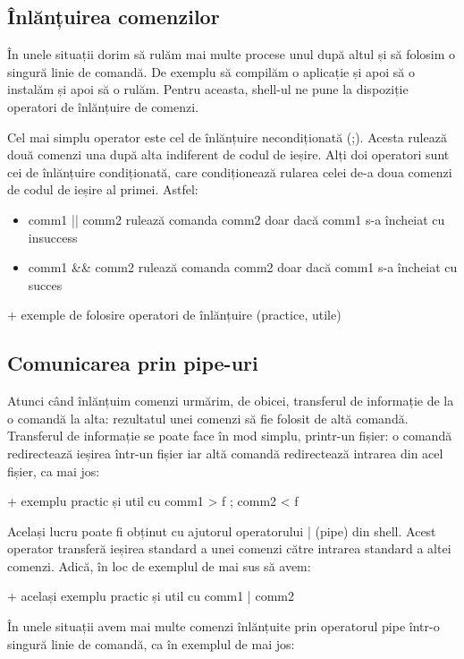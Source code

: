 \subsection{Înlănțuirea comenzilor}
\label{sec:procese-operatii-inlantuire}

În unele situații dorim să rulăm mai multe procese unul după altul și să folosim
o singură linie de comandă. De exemplu să compilăm o aplicație și apoi să o
instalăm și apoi să o rulăm. Pentru aceasta, shell-ul ne pune la dispoziție
operatori de înlănțuire de comenzi.

Cel mai simplu operator este cel de înlănțuire necondiționată (;). Acesta
rulează două comenzi una după alta indiferent de codul de ieșire. Alți doi
operatori sunt cei de înlănțuire condiționată, care condiționează rularea celei
de-a doua comenzi de codul de ieșire al primei. Astfel:

\begin{itemize}
	\item comm1 || comm2 rulează comanda comm2 doar dacă comm1 s-a încheiat cu insuccess
	\item comm1 \&\& comm2 rulează comanda comm2 doar dacă comm1 s-a încheiat cu succes
\end{itemize}

+ exemple de folosire operatori de înlănțuire (practice, utile)

\subsection{Comunicarea prin pipe-uri}
\label{sec:procese-operatii-pipe}

Atunci când înlănțuim comenzi urmărim, de obicei, transferul de informație de la
o comandă la alta: rezultatul unei comenzi să fie folosit de altă comandă.
Transferul de informație se poate face în mod simplu, printr-un fișier: o
comandă redirectează ieșirea într-un fișier iar altă comandă redirectează
intrarea din acel fișier, ca mai jos:

+     exemplu practic și util cu comm1 > f ; comm2 < f

Același lucru poate fi obținut cu ajutorul operatorului | (pipe) din shell.
Acest operator transferă ieșirea standard a unei comenzi către intrarea standard
a altei comenzi. Adică, în loc de exemplul de mai sus să avem:

+     același exemplu practic și util cu comm1 | comm2

În unele situații avem mai multe comenzi înlănțuite prin operatorul pipe într-o
singură linie de comandă, ca în exemplul de mai jos:

